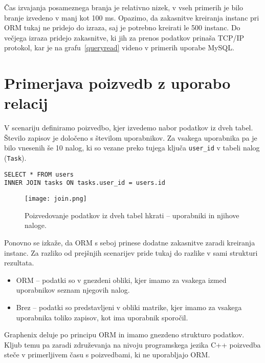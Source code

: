 \documentclass[a4paper,12pt,openright]{book}
\begin{document}
    \noindent
    Čas izvajanja posameznega branja je relativno nizek, v vseh primerih je bilo branje izvedeno v manj kot 100 ms. Opazimo, da zakasnitve kreiranja instanc pri ORM tukaj ne pridejo do izraza, saj je potrebno kreirati le 500 instanc. Do večjega izraza pridejo zakasnitve, ki jih za prenos podatkov prinaša TCP/IP protokol, kar je na grafu~\ref{queryread} videno v primerih uporabe MySQL.

    \section{Primerjava poizvedb z uporabo relacij}
    \label{join_lbl}

    V scenariju definiramo poizvedbo, kjer izvedemo nabor podatkov iz dveh tabel. Število zapisov je določeno s številom uporabnikov. Za vsakega uporabnika pa je bilo vnesenih še 10 nalog, ki so vezane preko tujega ključa {\tt user\_id} v tabeli nalog ({\tt Task}).
    
\begin{verbatim}
SELECT * FROM users 
INNER JOIN tasks ON tasks.user_id = users.id
\end{verbatim}

    \begin{figure}[H]
        \centerline{\texttt{[image: join.png]}}
        \caption{Poizvedovanje podatkov iz dveh tabel hkrati – uporabniki in njihove naloge.}
        \label{join}
    \end{figure}

    \noindent
    Ponovno se izkaže, da ORM s seboj prinese dodatne zakasnitve zaradi kreiranja instanc. Za razliko od prejšnjih scenarijev pride tukaj do razlike v sami strukturi rezultata.
    
    \begin{itemize}
        \item ORM – podatki so v gnezdeni obliki, kjer imamo za vsakega izmed uporabnikov seznam njegovih nalog.
        \item Brez – podatki so predstavljeni v obliki matrike, kjer imamo za vsakega uporabnika toliko zapisov, kot ima uporabnik sporočil.
    \end{itemize}

    \noindent
    Graphenix deluje po principu ORM in imamo gnezdeno strukturo podatkov. Kljub temu pa zaradi združevanja na nivoju programskega jezika C++ poizvedba steče v primerljivem času s poizvedbami, ki ne uporabljajo ORM.
    
\end{document}
